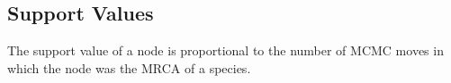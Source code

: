 \documentclass{llncs}
\begin{document}
\subsection{Support Values}
The support value of a node is proportional to the number of MCMC moves in which the node was the MRCA of a species.



\end{document}
